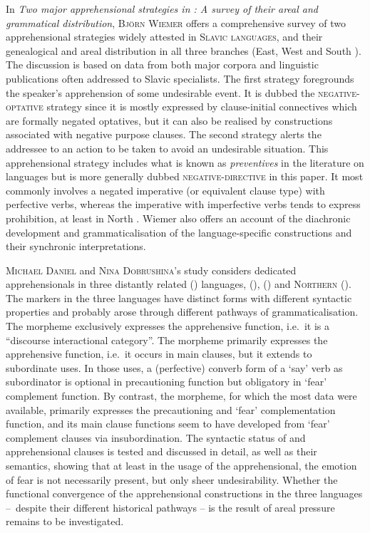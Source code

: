 \documentclass[output=paper,colorlinks,citecolor=brown]{langscibook}
\begin{document}
In \textit{Two major apprehensional strategies in : A survey of their areal and grammatical distribution}, \textsc{Björn} \textsc{Wiemer} offers a comprehensive survey of two apprehensional strategies widely attested in \textsc{Slavic} \textsc{languages}, and their genealogical and areal distribution in all three branches (East, West and South ). The discussion is based on data from both major corpora and linguistic publications often addressed to Slavic specialists. The first strategy foregrounds the speaker's apprehension of some undesirable event. It is dubbed the \textsc{negative-optative} strategy since it is mostly expressed by clause-initial connectives which are formally negated optatives, but it can also be realised by constructions associated with negative purpose clauses. The second strategy alerts the addressee to an action to be taken to avoid an undesirable situation. This apprehensional strategy includes what is known as \textit{preventives} in the literature on  languages but is more generally dubbed \textsc{negative-directive} in this paper. It most commonly involves a negated imperative (or equivalent clause type) with perfective verbs, whereas the imperative with imperfective verbs tends to express prohibition, at least in North . Wiemer also offers an account of the diachronic development and grammaticalisation of the language-specific constructions and their synchronic interpretations.



\textsc{Michael} \textsc{Daniel} and \textsc{Nina} \textsc{Dobrushina}'s study considers dedicated apprehensionals in three distantly related \textsc{} () languages, \textsc{} (), \textsc{} () and \textsc{Northern} \textsc{} (). The markers in the three languages have distinct forms with different syntactic properties and probably arose through different pathways of grammaticalisation. The  morpheme exclusively expresses the apprehensive function, i.e.\ it is a ``discourse interactional category''. The  morpheme primarily expresses the apprehensive function, i.e.\ it occurs in main clauses, but it extends to subordinate uses. In those uses, a (perfective) converb form of a `say' verb as subordinator is optional in precautioning function but obligatory in `fear' complement function. By contrast, the  morpheme, for which the most data were available, primarily expresses the precautioning and `fear' complementation function, and its main clause functions seem to have developed from `fear' complement clauses via insubordination. The syntactic status of  and  apprehensional clauses is tested and discussed in detail, as well as their semantics, showing that at least in the usage of the  apprehensional, the emotion of fear is not necessarily present, but only sheer undesirability. Whether the functional convergence of the apprehensional constructions in the three languages –~despite their different historical pathways – is the result of areal pressure remains to be investigated.
\end{document}
